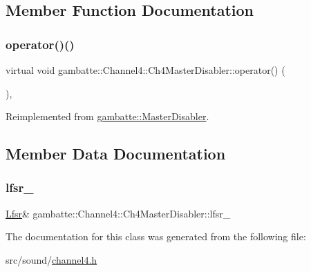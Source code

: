\subsection{Member Function Documentation}
\mbox{\label{classgambatte_1_1Channel4_1_1Ch4MasterDisabler_a7f9ddd23602b991df7ee5bb2a734cc99}} 
\subsubsection{\texorpdfstring{operator()()}{operator()()}}
{\footnotesize\ttfamily virtual void gambatte\+::\+Channel4\+::\+Ch4\+Master\+Disabler\+::operator() (\begin{DoxyParamCaption}{ }\end{DoxyParamCaption})\hspace{0.3cm}{\ttfamily [inline]}, {\ttfamily [virtual]}}



Reimplemented from \hyperlink{classgambatte_1_1MasterDisabler_a6b69f64af3e8112eac3767a74ee0e322}{gambatte\+::\+Master\+Disabler}.



\subsection{Member Data Documentation}
\mbox{\label{classgambatte_1_1Channel4_1_1Ch4MasterDisabler_a147cca0f452dcbd3df51343e925bac0a}} 
\subsubsection{\texorpdfstring{lfsr\+\_\+}{lfsr\_}}
{\footnotesize\ttfamily \hyperlink{classgambatte_1_1Channel4_1_1Lfsr}{Lfsr}\& gambatte\+::\+Channel4\+::\+Ch4\+Master\+Disabler\+::lfsr\+\_\+\hspace{0.3cm}{\ttfamily [private]}}



The documentation for this class was generated from the following file\+:\begin{DoxyCompactItemize}
\item 
src/sound/\hyperlink{channel4_8h}{channel4.\+h}\end{DoxyCompactItemize}
